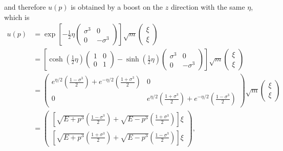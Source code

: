\documentclass[hyperref, a4paper]{article}
\begin{document}
and therefore $u(p)$ is obtained by a boost on the $z$ direction with the same $\eta$, 
which is 
\begin{equation}
    \begin{aligned}
        u(p) &=\exp \left[-\frac{1}{2} \eta\left(\begin{array}{cc}
        \sigma^{3} & 0 \\
        0 & -\sigma^{3}
        \end{array}\right)\right] \sqrt{m}\left(\begin{array}{l}
        \xi \\
        \xi
        \end{array}\right) \\
        &=\left[\cosh \left(\frac{1}{2} \eta\right)\left(\begin{array}{cc}
        1 & 0 \\
        0 & 1
        \end{array}\right)-\sinh \left(\frac{1}{2} \eta\right)\left(\begin{array}{cc}
        \sigma^{3} & 0 \\
        0 & -\sigma^{3}
        \end{array}\right)\right] \sqrt{m}\left(\begin{array}{l}
        \xi \\
        \xi
        \end{array}\right) \\
        &=\left(\begin{array}{cc}
        e^{\eta / 2}\left(\frac{1-\sigma^{3}}{2}\right)+e^{-\eta / 2}\left(\frac{1+\sigma^{3}}{2}\right) & 0 \\
        0 & e^{\eta / 2}\left(\frac{1+\sigma^{3}}{2}\right)+e^{-\eta / 2}\left(\frac{1-\sigma^{3}}{2}\right)
        \end{array}\right) \sqrt{m}\left(\begin{array}{l}
        \xi \\
        \xi
        \end{array}\right) \\
        &=\left(\begin{array}{l}
        {\left[\sqrt{E+p^{3}}\left(\frac{1-\sigma^{3}}{2}\right)+\sqrt{E-p^{3}}\left(\frac{1+\sigma^{3}}{2}\right)\right] \xi} \\
        {\left[\sqrt{E+p^{3}}\left(\frac{1+\sigma^{3}}{2}\right)+\sqrt{E-p^{3}}\left(\frac{1-\sigma^{3}}{2}\right)\right] \xi}
        \end{array}\right) ,
        \end{aligned}
\end{equation}
\end{document}
